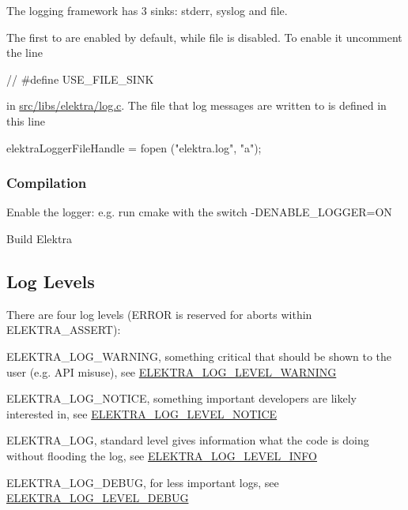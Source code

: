The logging framework has 3 sinks\+: stderr, syslog and file.

The first to are enabled by default, while file is disabled. To enable it uncomment the line


\begin{DoxyCode}
\textcolor{comment}{// #define USE\_FILE\_SINK}
\end{DoxyCode}


in {\ttfamily \hyperlink{log_8c}{src/libs/elektra/log.\+c}}. The file that log messages are written to is defined in this line


\begin{DoxyCode}
elektraLoggerFileHandle = fopen (\textcolor{stringliteral}{"elektra.log"}, \textcolor{stringliteral}{"a"});
\end{DoxyCode}


\subsubsection*{Compilation}


\begin{DoxyEnumerate}
\item Enable the logger\+: e.\+g. run {\ttfamily cmake} with the switch {\ttfamily -\/\+D\+E\+N\+A\+B\+L\+E\+\_\+\+L\+O\+G\+G\+ER=ON}
\item Build Elektra
\end{DoxyEnumerate}

\subsection*{Log Levels}

There are four log levels (E\+R\+R\+OR is reserved for aborts within {\ttfamily E\+L\+E\+K\+T\+R\+A\+\_\+\+A\+S\+S\+E\+RT})\+:


\begin{DoxyItemize}
\item {\ttfamily E\+L\+E\+K\+T\+R\+A\+\_\+\+L\+O\+G\+\_\+\+W\+A\+R\+N\+I\+NG}, something critical that should be shown to the user (e.\+g. A\+PI misuse), see \hyperlink{kdblogger_8h_a4096a2ccd61c6f5ad60e9015fd1bbb4ba0524fff5c46e0cf07287c473c46cc8e2}{E\+L\+E\+K\+T\+R\+A\+\_\+\+L\+O\+G\+\_\+\+L\+E\+V\+E\+L\+\_\+\+W\+A\+R\+N\+I\+NG}
\item {\ttfamily E\+L\+E\+K\+T\+R\+A\+\_\+\+L\+O\+G\+\_\+\+N\+O\+T\+I\+CE}, something important developers are likely interested in, see \hyperlink{kdblogger_8h_a4096a2ccd61c6f5ad60e9015fd1bbb4ba329fc1e04c797ab8e54a137b21f41baf}{E\+L\+E\+K\+T\+R\+A\+\_\+\+L\+O\+G\+\_\+\+L\+E\+V\+E\+L\+\_\+\+N\+O\+T\+I\+CE}
\item {\ttfamily E\+L\+E\+K\+T\+R\+A\+\_\+\+L\+OG}, standard level gives information what the code is doing without flooding the log, see \hyperlink{kdblogger_8h_a4096a2ccd61c6f5ad60e9015fd1bbb4ba01618746c91d9d1090f599f604b9b832}{E\+L\+E\+K\+T\+R\+A\+\_\+\+L\+O\+G\+\_\+\+L\+E\+V\+E\+L\+\_\+\+I\+N\+FO}
\item {\ttfamily E\+L\+E\+K\+T\+R\+A\+\_\+\+L\+O\+G\+\_\+\+D\+E\+B\+UG}, for less important logs, see \hyperlink{kdblogger_8h_a4096a2ccd61c6f5ad60e9015fd1bbb4ba24c7a4c44a8b99b978dc99806d083386}{E\+L\+E\+K\+T\+R\+A\+\_\+\+L\+O\+G\+\_\+\+L\+E\+V\+E\+L\+\_\+\+D\+E\+B\+UG} 
\end{DoxyItemize}